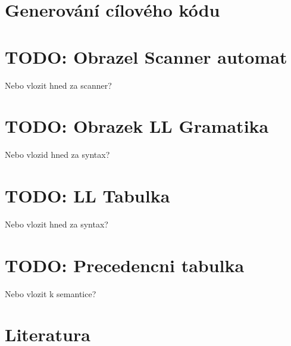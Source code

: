 \documentclass[12pt]{article}
\begin{document}
    \section{Generování cílového kódu}
    \newpage
    \section{TODO: Obrazel Scanner automat}
    Nebo vlozit hned za scanner?
    \section{TODO: Obrazek LL Gramatika}
    Nebo vlozid hned za syntax?
    \section{TODO: LL Tabulka}
    Nebo vlozit hned za syntax?
    \section{TODO: Precedencni tabulka}
    Nebo vlozit k semantice?
    
    \newpage
    \section{Literatura}
\end{document}
